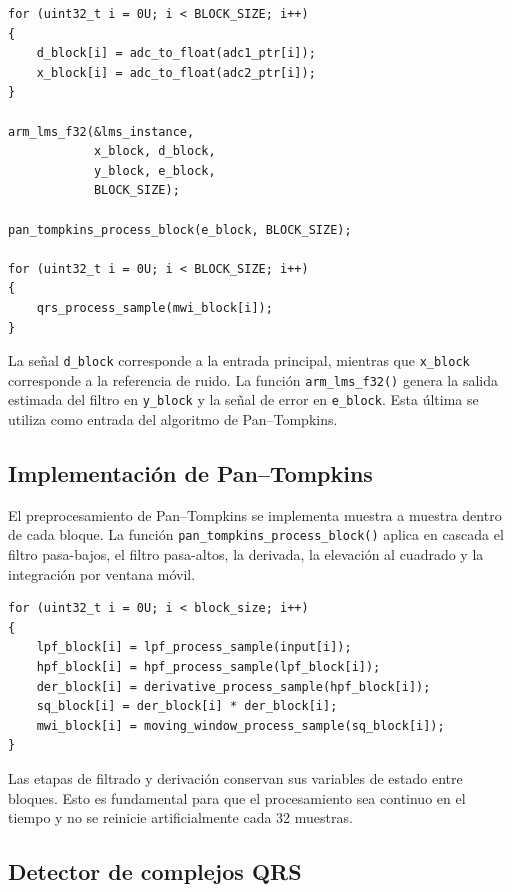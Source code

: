 \documentclass[12pt]{article}
\begin{document}
		\begin{lstlisting}[style=mystyle, caption={Núcleo del procesamiento por bloque.}]
for (uint32_t i = 0U; i < BLOCK_SIZE; i++)
{
    d_block[i] = adc_to_float(adc1_ptr[i]);
    x_block[i] = adc_to_float(adc2_ptr[i]);
}

arm_lms_f32(&lms_instance,
            x_block, d_block,
            y_block, e_block,
            BLOCK_SIZE);

pan_tompkins_process_block(e_block, BLOCK_SIZE);

for (uint32_t i = 0U; i < BLOCK_SIZE; i++)
{
    qrs_process_sample(mwi_block[i]);
}
		\end{lstlisting}

		La señal \texttt{d\_block} corresponde a la entrada principal, mientras que \texttt{x\_block} corresponde a la referencia de ruido. La función \texttt{arm\_lms\_f32()} genera la salida estimada del filtro en \texttt{y\_block} y la señal de error en \texttt{e\_block}. Esta última se utiliza como entrada del algoritmo de Pan--Tompkins.

		\subsection{Implementación de Pan--Tompkins}

		El preprocesamiento de Pan--Tompkins se implementa muestra a muestra dentro de cada bloque. La función \texttt{pan\_tompkins\_process\_block()} aplica en cascada el filtro pasa-bajos, el filtro pasa-altos, la derivada, la elevación al cuadrado y la integración por ventana móvil.

		\begin{lstlisting}[style=mystyle, caption={Cadena de procesamiento Pan--Tompkins.}]
for (uint32_t i = 0U; i < block_size; i++)
{
    lpf_block[i] = lpf_process_sample(input[i]);
    hpf_block[i] = hpf_process_sample(lpf_block[i]);
    der_block[i] = derivative_process_sample(hpf_block[i]);
    sq_block[i] = der_block[i] * der_block[i];
    mwi_block[i] = moving_window_process_sample(sq_block[i]);
}
		\end{lstlisting}

		Las etapas de filtrado y derivación conservan sus variables de estado entre bloques. Esto es fundamental para que el procesamiento sea continuo en el tiempo y no se reinicie artificialmente cada 32 muestras.

		\subsection{Detector de complejos QRS}
\end{document}
